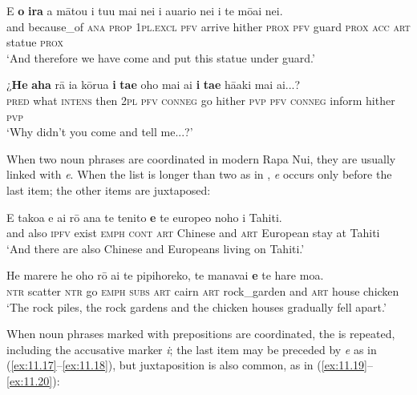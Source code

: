 \ea\label{ex:11.13}
\gll {\ꞌ}E \textbf{{\ꞌ}o} \textbf{ira} a mātou i tu{\ꞌ}u mai nei i {\ꞌ}auario nei  i te mōai nei.\\
and because\_of \textsc{ana} \textsc{prop} \textsc{1pl.excl} \textsc{pfv} arrive hither \textsc{prox} \textsc{pfv} guard \textsc{prox}  \textsc{acc} \textsc{art} statue \textsc{prox}\\

\glt 
‘And therefore we have come and put this statue under guard.’ \textstyleExampleref{[R650.034]} 
\z

\ea\label{ex:11.14}
\gll ¿\textbf{He} \textbf{aha} rā ia kōrua \textbf{i} \textbf{ta{\ꞌ}e} oho mai ai  \textbf{i} \textbf{ta{\ꞌ}e} hā{\ꞌ}aki mai ai...?\\
\textsc{pred} what \textsc{intens} then \textsc{2pl} \textsc{pfv} \textsc{conneg} go hither \textsc{pvp}  \textsc{pfv} \textsc{conneg} inform hither \textsc{pvp}\\

\glt 
‘Why didn’t you come and tell me...?’ \textstyleExampleref{[R313.106]} 
\z

When two noun phrases are coordinated in modern Rapa Nui, they are usually linked with \textit{{\ꞌ}e}. When the list is longer than two as in , \textit{{\ꞌ}e} occurs only before the last item; the other items are juxtaposed:

\ea\label{ex:11.15}
\gll {\ꞌ}E tako{\ꞌ}a e ai rō {\ꞌ}ana te tenito \textbf{{\ꞌ}e} te europeo noho {\ꞌ}i Tahiti. \\
and also \textsc{ipfv} exist \textsc{emph} \textsc{cont} \textsc{art} Chinese and \textsc{art} European stay at Tahiti \\

\glt 
‘And there are also Chinese and Europeans living on Tahiti.’ \textstyleExampleref{[R348.011]} 
\z

\ea\label{ex:11.16}
\gll He marere he oho rō {\ꞌ}ai te pipihoreko, te manavai  \textbf{{\ꞌ}e} te hare moa.\\
\textsc{ntr} scatter \textsc{ntr} go \textsc{emph} \textsc{subs} \textsc{art} cairn \textsc{art} rock\_garden  and \textsc{art} house chicken\\

\glt
‘The rock piles, the rock gardens and the chicken houses gradually fell apart.’ \textstyleExampleref{[R621.018]} 
\z

When noun phrases marked with prepositions are coordinated, the  is repeated, including the accusative marker \textit{i}; the last item may be preceded by \textit{{\ꞌ}e} as in (\ref{ex:11.17}–\ref{ex:11.18}), but juxtaposition is also common, as in (\ref{ex:11.19}–\ref{ex:11.20}):

